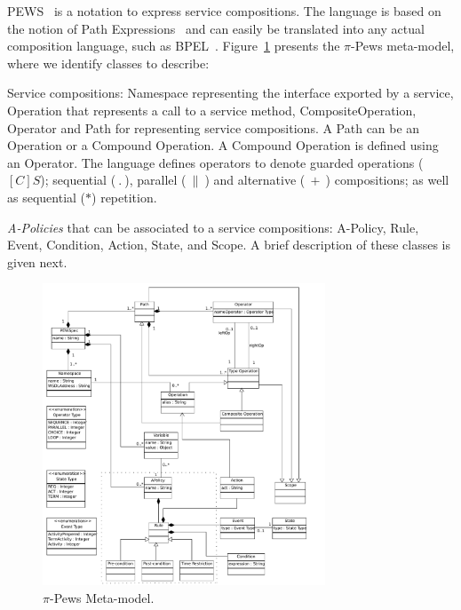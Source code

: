 PEWS~\cite{BHM06,Placido2010LTPD} is a notation to express service compositions.
The language is based on the notion of Path Expressions~\cite{And79} and can easily be translated into any actual composition language, such as BPEL~\cite{bpel03}. 
Figure~\ref{fig:PPEWSmetamodel} presents the $\pi$-{\sc Pews} meta-model, where we identify classes to describe:
\begin{itemizedTrivlist}
\item Service compositions: {\sc Namespace} representing the interface exported by a service, {\sc Operation} that represents a call to a service method, {\sc CompositeOperation}, {\sc Operator} and {\sc Path} for representing service compositions.
A {\sc Path} can be an {\sc Operation} or a {\sc Compound Operation}. 
A {\sc Compound Operation} is defined using an {\sc Operator}.
The language defines operators to denote guarded operations ($[C]S$); sequential ($\ . \ $), parallel ($\ \| \ $) and alternative ($\ + \ $) compositions; as well as sequential ($*$) repetition.

\item {\em A-Policies} that can be associated to a service compositions:  {\sc A-Policy}, {\sc Rule}, {\sc Event}, {\sc Condition}, {\sc Action}, {\sc State}, and {\sc Scope}.
A brief description of these classes is given next.
\end{itemizedTrivlist}
%
\begin{figure}
\centering
\includegraphics[width=0.75\textwidth]{figs/PEWSMetamodel}
\caption{$\pi$-{\sc Pews} Meta-model.}
\label{fig:PPEWSmetamodel}
\end{figure}

